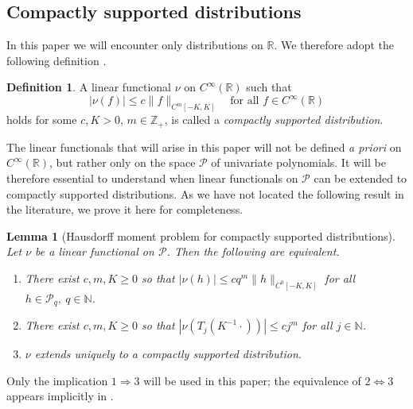 \documentclass[10pt,reqno]{amsart}
\newtheorem{lem}[thm]{Lemma}
\theoremstyle{definition}
\newtheorem{defn}[thm]{Definition}
\theoremstyle{remark}
\numberwithin{equation}{section}
\numberwithin{figure}{section}
\numberwithin{table}{section}
\begin{document}
\subsection{Compactly supported distributions}
\label{sec:schwartz}

In this paper we will encounter only distributions on $\mathbb{R}$. We
therefore adopt the following definition \cite[\S 2.3]{Hor03}.

\begin{defn}
\label{defn:distr}
A linear functional
$\nu$ on $C^\infty(\mathbb{R})$ such that 
$$
	|\nu(f)| \le c\|f\|_{C^m[-K,K]}\quad
	\text{for all }f\in C^\infty(\mathbb{R})
$$
holds for some $c,K>0$, $m\in\mathbb{Z}_+$,
is called a \emph{compactly supported distribution}.
\end{defn}

The linear functionals that will arise in this paper will not be defined 
\emph{a priori} on $C^\infty(\mathbb{R})$, but rather only on the space 
$\mathcal{P}$ of univariate polynomials. It will be therefore essential to 
understand when linear functionals on $\mathcal{P}$ can be extended to 
compactly supported distributions. As we have not located the following 
result in the literature, we prove it here for completeness.

\begin{lem}[Hausdorff moment problem for compactly supported distributions]
\label{lem:hauss}
Let $\nu$ be a linear functional on $\mathcal{P}$. Then the 
following are equivalent.
\begin{enumerate}[leftmargin=*,label=\arabic*.]
\addtolength{\itemsep}{.5mm}
\item 
There exist $c,m,K\ge 0$ so that 
$|\nu(h)| \le c q^m \|h\|_{C^0[-K,K]}$
for all $h\in\mathcal{P}_q,~q\in\mathbb{N}$.
\item
There exist $c,m,K\ge 0$ so that
$|\nu(T_j(K^{-1}\cdot))| \le c j^m$ for all $j\in\mathbb{N}$.
\item
$\nu$ extends uniquely to a compactly supported distribution.
\end{enumerate}
\end{lem}

Only the implication $1\Rightarrow 3$ will be used in this paper; the 
equivalence of $2\Leftrightarrow 3$ appears implicitly in 
\cite[p.\ 38]{EK87}.
\end{document}
